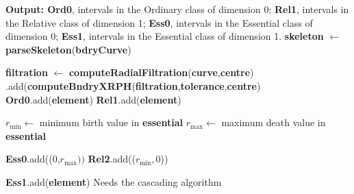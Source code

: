 \documentclass[a4paper,11pt]{article}
\theoremstyle{definition}
\begin{document}
\begin{algorithm}[H]
\begin{algorithmic}
\State \textbf{Output: Ord0}, intervals in the Ordinary class of dimension 0;
\State\;\;\;\;\;\;\;\;\;\;\;\;\;\;\; \textbf{Rel1}, intervals in the Relative class of dimension 1;
\State\;\;\;\;\;\;\;\;\;\;\;\;\;\;\; \textbf{Ess0}, intervals in the Essential class of dimension 0;
\State\;\;\;\;\;\;\;\;\;\;\;\;\;\;\; \textbf{Ess1}, intervals in the Essential class of dimension 1.
\vspace{0.2cm}
\State \textbf{skeleton} $\gets$ \textbf{parseSkeleton}(\textbf{bdryCurve})

    \State \textbf{filtration} $\gets$ \textbf{computeRadialFiltration}(\textbf{curve},\textbf{centre})
    .add(\textbf{computeBndryXRPH}(\textbf{filtration},\textbf{tolerance},\textbf{centre})
\EndFor
{}
        \State \textbf{Ord0}.add(\textbf{element})
    \Else
        \State \textbf{Rel1}.add(\textbf{element})
    \EndIf
\EndFor

\State $r_{\min}\gets$ minimum birth value in \textbf{essential}
\State $r_{\max}\gets$ maximum death value in \textbf{essential} 

  
    \State \textbf{Ess0}.add((0,$r_{\max}))$
    \State \textbf{Rel2}.add(($r_{\min},0$))
\EndIf


        \State \textbf{Ess1}.add(\textbf{element})
    \EndIf
\EndFor
\Else {} 
\State Needs the cascading algorithm
\EndIf
\end{algorithmic}
\end{algorithm}
  
\end{document}

